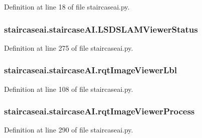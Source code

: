 Definition at line 18 of file staircaseai.\-py.

\hypertarget{classstaircaseai_1_1staircaseAI_ae6980c88f11e387fec4f4558e1fd60ec}{
\subsubsection[{L\-S\-D\-S\-L\-A\-M\-Viewer\-Status}]{\setlength{\rightskip}{0pt plus 5cm}staircaseai.\-staircase\-A\-I.\-L\-S\-D\-S\-L\-A\-M\-Viewer\-Status}}\label{classstaircaseai_1_1staircaseAI_ae6980c88f11e387fec4f4558e1fd60ec}


Definition at line 275 of file staircaseai.\-py.

\hypertarget{classstaircaseai_1_1staircaseAI_a40b886c5b0bd0895901671e0bdc1a006}{
\subsubsection[{rqt\-Image\-Viewer\-Lbl}]{\setlength{\rightskip}{0pt plus 5cm}staircaseai.\-staircase\-A\-I.\-rqt\-Image\-Viewer\-Lbl}}\label{classstaircaseai_1_1staircaseAI_a40b886c5b0bd0895901671e0bdc1a006}


Definition at line 108 of file staircaseai.\-py.

\hypertarget{classstaircaseai_1_1staircaseAI_a6d00dba2967e83eb5114c61381a1db29}{
\subsubsection[{rqt\-Image\-Viewer\-Process}]{\setlength{\rightskip}{0pt plus 5cm}staircaseai.\-staircase\-A\-I.\-rqt\-Image\-Viewer\-Process}}\label{classstaircaseai_1_1staircaseAI_a6d00dba2967e83eb5114c61381a1db29}


Definition at line 290 of file staircaseai.\-py.


